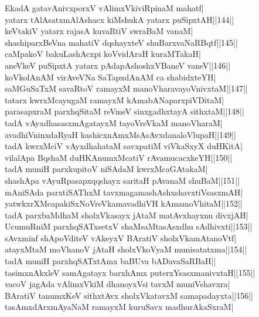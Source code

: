 \documentclass{article}
\begin{document}
EkadA gatavAnivxporxV vAlimxVkiviRpinaM mahatf|\\
yatarx tAlAsatxmAlAshacx kiMshukA yatarx puSipxtAH||144||\\
keVtakiV yatarx rajasA kuvaRtiV swraBaM vanaM|\\
shashiparxBeVna mahatiV dqshayxteV shuBarxvaNaRBqtf||145||\\
caMpakoV bakuLashAcxpi koVvidAraH kuraMTakaH|\\
aneVkeV puSipxtA yatarx pAdapAshoshxVBaneV vaneV||146||\\
koVkolAnAM virAveVNa SaTapxdAnAM ca shabidxteYH|\\
saMGuSaTxM savaRtoV ramayxM manoVharavayoVnivxtaM||147||\\
tatarx kwrxMcayugaM ramayxM kAmabANaparxpiVDitaM|\\
parasapxraM parxhqSitaM reVmeV sinxgadhxtayA sithxtaM||148||\\
tadA vAyxdhasasxmAgatayxM tayoVreVkaM manoVharaM|\\
avadhiVninxdaRyaH kashicxnAmxMsAsAvxdanaloVlupaH||149||\\
tadA kwrxMciV vAyxdhahataM savxpatiM viVkaSxyX duHKitA|\\
vilalApa BqshaM duHKAnumxMcatiV rAvamucacxkeYH||150||\\
tadA muniH parxkupitoV niSAdaM kwrxMcaGAtakaM|\\
shashApa vAyuRpasapxqqshayx saritaH pAvanaM shuBaM||151||\\
mAniSAda parxtiSAThxM tavxmagamashAshxshavxtiVsasxmAH|\\
yatwkxrXMcapakiSxNoVreVkamavadhiVH kAmamoVhitaM||152||\\
tadA parxbaMdhaM sholxVkasayx jAtaM matAvxhayxnu divxjAH|\\
UcumuRniM parxhqSATxsetxV shaMsaMtasAsxdhu sAdhivxti||153||\\
sAvxminf shApoVditeV vAkeyxV BAratiV sholxVkamAtanoVtf|\\
atayxMtaM moVhanoV jAtaH sholxVkoVyaM munisatatxma||154||\\
tadA muniH parxhqSATxtAmx baBUva bADavaSaRBaH||\\
tasimxnAkxleV samAgatayx barxhAmx puterxYsasxmanivxtaH||155||\\
vacoV jagAda vAlimxVkiM dhanoyxVsi tavxM muniVshavxra|\\
BAratiV tanumxKeV sithxtAvx sholxVkatavxM samapadayxta||156||\\
tasAmxdArxmAyaNaM ramayxM kuruSavx madhurAkaSxraM|\\
\end{document}
